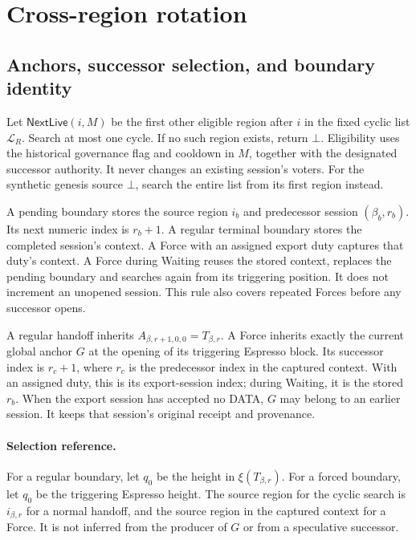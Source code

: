 \documentclass[11pt,a4paper]{article}
\newcommand{\tagg}[1]{\ensuremath{\mathsf{#1}}}
\newcounter{protocol}
\begin{document}
\section{Cross-region rotation}
\label{sec:xprotocols}
\subsection{Anchors, successor selection, and boundary identity}
\label{sec:witness}
Let $\tagg{NextLive}(i,M)$ be the first other eligible region after $i$
in the fixed cyclic list $\mathcal L_R$. Search at most one cycle.
If no such region exists, return $\bot$. Eligibility uses the historical
governance flag and cooldown in $M$, together with the designated
successor authority. It never changes an existing session's voters.
For the synthetic genesis source $\bot$, search the entire list from
its first region instead.

A pending boundary stores the source region $i_b$ and predecessor
session $(\beta_b,r_b)$. Its next numeric index is $r_b+1$.
A regular terminal boundary stores the completed session's context.
A Force with an assigned export duty captures that duty's context.
A Force during Waiting reuses the stored context, replaces the pending
boundary and searches again from its triggering position. It does not
increment an unopened session. This rule also covers repeated Forces
before any successor opens.

A regular handoff inherits $A_{\beta,r+1,0,0}=T_{\beta,r}$.
A Force inherits exactly the current global anchor $G$ at the opening
of its triggering Espresso block. Its successor index is $r_c+1$,
where $r_c$ is the predecessor index in the captured context. With an
assigned duty, this is its export-session index; during Waiting, it is
the stored $r_b$. When the export session has accepted no DATA, $G$ may
belong to an earlier session. It keeps that session's original receipt and provenance.

\paragraph{Selection reference.}
For a regular boundary, let $q_0$ be the height in $\xi(T_{\beta,r})$.
For a forced boundary, let $q_0$ be the triggering Espresso height.
The source region for the cyclic search is $i_{\beta,r}$ for a normal handoff,
and the source region in the captured context for a Force. It is not inferred from
the producer of $G$ or from a speculative successor.
\end{document}
